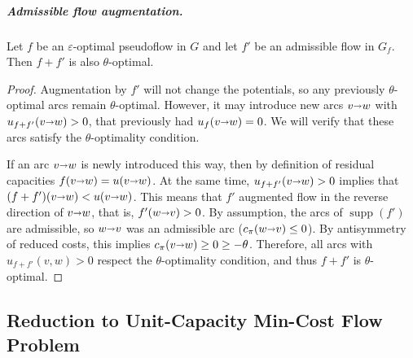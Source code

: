\documentclass[a4paper,UKenglish]{socg-lipics-v2018}
\makeatletter
\def\eps{\varepsilon}
\def\arcto{\mathord\shortrightarrow}
\def\arc#1#2{#1\arcto#2}
\def\supp{\operatorname{supp}}
\theoremstyle{plain}
\numberwithin{figure}{section}
\renewcommand{\paragraph}{\subparagraph}
\def\n@te#1{\textsf{\boldmath \textbf{$\langle\!\langle$#1$\rangle\!\rangle$}}\leavevmode}
\def\note#1{\textcolor{red}{\n@te{#1}}}
\makeatother
\begin{document}
\begin{toappendix}
\paragraph{Admissible flow augmentation.}

\begin{lemmarep}
\label{lemma:eps_opt_preserve}
Let $f$ be an $\eps$-optimal pseudoflow in $G$ and let $f'$ be an
admissible flow in $G_f$.
Then $f + f'$ is also $\theta$-optimal.
\end{lemmarep}

\begin{proof}
Augmentation by $f'$ will not change the potentials, so any previously
$\theta$-optimal arcs remain $\theta$-optimal.
However, it may introduce new arcs $\arc vw$ with $u_{f+f'}(\arc vw) > 0$, that previously had
$u_f(\arc vw) = 0$.
We will verify that these arcs satisfy the $\theta$-optimality condition.

If an arc $\arc vw$ is newly introduced this way, then by definition of residual
capacities $f(\arc vw) = u(\arc vw)$.
At the same time, $u_{f+f'}(\arc vw) > 0$ implies that $(f+f')(\arc vw) < u(\arc vw)$.
This means that $f'$ augmented flow in the reverse direction of $\arc vw$,
that is, $f'(\arc wv) > 0$.
By assumption, the arcs of $\supp(f')$ are admissible, so $\arc wv$ was an
admissible arc ($c_\pi(\arc wv) \leq 0$).
By antisymmetry of reduced costs, this implies $c_\pi(\arc vw) \geq 0 \geq -\theta$.
Therefore, all arcs with $u_{f+f'}(v, w) > 0$ respect the $\theta$-optimality condition,
and thus $f+f'$ is $\theta$-optimal.
\end{proof}
\end{toappendix}



\subsection{Reduction to Unit-Capacity Min-Cost Flow Problem}
\label{SS:reduction}
\end{document}
